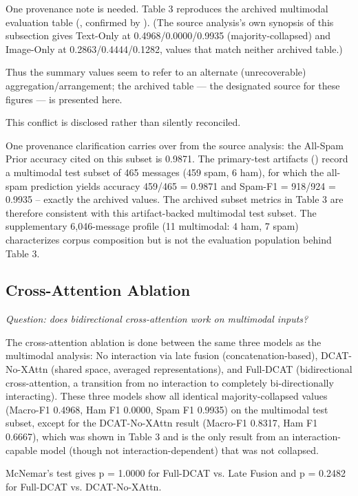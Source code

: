 \documentclass[10pt,twoside]{article}
\begin{document}
One provenance note is needed. Table 3 reproduces the archived multimodal evaluation table (, confirmed by ). (The source analysis's own synopsis of this subsection gives Text-Only at 0.4968/0.0000/0.9935 (majority-collapsed) and Image-Only at 0.2863/0.4444/0.1282, values that match neither archived table.)

Thus the summary values seem to refer to an alternate (unrecoverable) aggregation/arrangement; the archived table --- the designated source for these figures --- is presented here.

This conflict is disclosed rather than silently reconciled.

One provenance clarification carries over from the source analysis: the All-Spam Prior accuracy cited on this subset is 0.9871. The primary-test artifacts () record a multimodal test subset of 465 messages (459 spam, 6 ham), for which the all-spam prediction yields accuracy 459/465 = 0.9871 and Spam-F1 = 918/924 = 0.9935 -- exactly the archived values. The archived subset metrics in Table 3 are therefore consistent with this artifact-backed multimodal test subset. The supplementary 6,046-message profile (11 multimodal: 4 ham, 7 spam) characterizes corpus composition but is not the evaluation population behind Table 3.

\subsection{Cross-Attention Ablation}\label{sec:7.3}

\emph{Question: does bidirectional cross-attention work on multimodal inputs?}

The cross-attention ablation is done between the same three models as the multimodal analysis: No interaction via late fusion (concatenation-based), DCAT-No-XAttn (shared space, averaged representations), and Full-DCAT (bidirectional cross-attention, a transition from no interaction to completely bi-directionally interacting). These three models show all identical majority-collapsed values (Macro-F1 0.4968, Ham F1 0.0000, Spam F1 0.9935) on the multimodal test subset, except for the DCAT-No-XAttn result (Macro-F1 0.8317, Ham F1 0.6667), which was shown in Table 3 and is the only result from an interaction-capable model (though not interaction-dependent) that was not collapsed.

McNemar's test gives p = 1.0000 for Full-DCAT vs. Late Fusion and p = 0.2482 for Full-DCAT vs. DCAT-No-XAttn.
\end{document}
